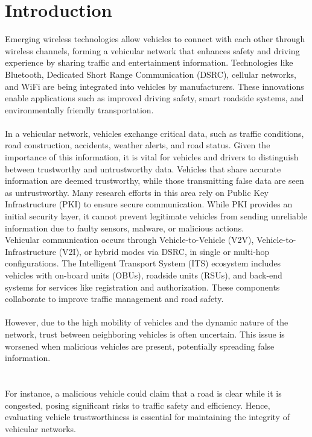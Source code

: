 \documentclass[11pt]{IEEEphot}
\begin{document}
\section{Introduction}
\vspace{10pt}
Emerging wireless technologies allow vehicles to connect with each other through wireless channels, forming a vehicular network that enhances safety and driving experience by sharing traffic and entertainment information. Technologies like Bluetooth, Dedicated Short Range Communication (DSRC), cellular networks, and WiFi are being integrated into vehicles by manufacturers. These innovations enable applications such as improved driving safety, smart roadside systems, and environmentally friendly transportation.
\\[0pt]
\\
In a vehicular network, vehicles exchange critical data, such as traffic conditions, road construction, accidents, weather alerts, and road status. Given the importance of this information, it is vital for vehicles and drivers to distinguish between trustworthy and untrustworthy data. Vehicles that share accurate information are deemed trustworthy, while those transmitting false data are seen as untrustworthy. Many research efforts in this area rely on Public Key Infrastructure (PKI) to ensure secure communication. While PKI provides an initial security layer, it cannot prevent legitimate vehicles from sending unreliable information due to faulty sensors, malware, or malicious actions.
\\
Vehicular communication occurs through Vehicle-to-Vehicle (V2V), Vehicle-to-Infrastructure (V2I), or hybrid modes via DSRC, in single or multi-hop configurations. The Intelligent Transport System (ITS) ecosystem includes vehicles with on-board units (OBUs), roadside units (RSUs), and back-end systems for services like registration and authorization. These components collaborate to improve traffic management and road safety.
\\
\\
However, due to the high mobility of vehicles and the dynamic nature of the network, trust between neighboring vehicles is often uncertain. This issue is worsened when malicious vehicles are present, potentially spreading false information. \\
\\
\\
For instance, a malicious vehicle could claim that a road is clear while it is congested, posing significant risks to traffic safety and efficiency. Hence, evaluating vehicle trustworthiness is essential for maintaining the integrity of vehicular networks.
\end{document}
